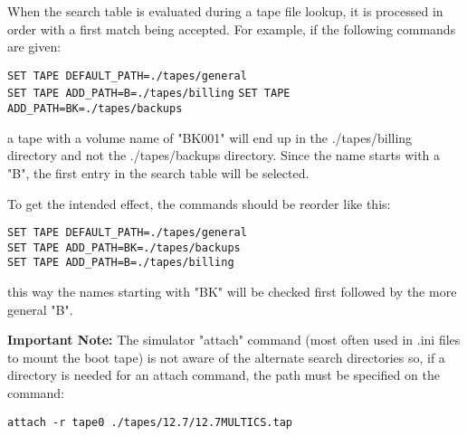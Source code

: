 When the search table is evaluated during a tape file lookup, it is processed in order with a first
match being accepted. For example, if the following commands are given:

\begin{adjustwidth}{5ex}{1ex}
	\texttt{SET TAPE DEFAULT\_PATH=./tapes/general} \\
	\texttt{SET TAPE ADD\_PATH=B=./tapes/billing}
	\texttt{SET TAPE ADD\_PATH=BK=./tapes/backups} \\
\end{adjustwidth}  

a tape with a volume name of "BK001" will end up in the ./tapes/billing directory and not the
./tapes/backups directory. Since the name starts with a "B", the first entry in the search table
will be selected.

To get the intended effect, the commands should be reorder like this:

\begin{adjustwidth}{5ex}{1ex}
	\texttt{SET TAPE DEFAULT\_PATH=./tapes/general} \\
	\texttt{SET TAPE ADD\_PATH=BK=./tapes/backups} \\
	\texttt{SET TAPE ADD\_PATH=B=./tapes/billing}
\end{adjustwidth}  

this way the names starting with "BK" will be checked first followed by the more general "B".

\textbf{Important Note:} The simulator "attach" command (most often used in .ini files to mount
the boot tape) is not aware of the alternate search directories so, if a directory is needed for
an attach command, the path must be specified on the command:

\begin{adjustwidth}{5ex}{1ex}
	\texttt{attach -r tape0 ./tapes/12.7/12.7MULTICS.tap}
\end{adjustwidth}  

